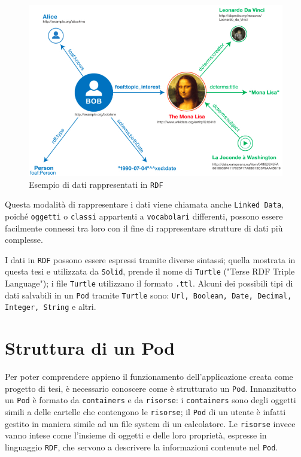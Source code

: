 \begin{figure}[ht]
	\centering
	\includegraphics[width=0.87
	\textwidth,  keepaspectratio]{fig/linkedData}
	\caption{Esempio di dati rappresentati in {\tt RDF}}
	\label{fig:linkedData}
\end{figure}

\medskip

Questa modalità di rappresentare i dati viene chiamata anche {\tt Linked Data}, poiché {\tt oggetti} o {\tt classi} appartenti a {\tt vocabolari} differenti, possono essere facilmente connessi tra loro con il fine di rappresentare strutture di dati più complesse.

\medskip

I dati in {\tt RDF} possono essere espressi tramite diverse sintassi; quella mostrata in questa tesi e utilizzata da {\tt Solid}, prende il nome di {\tt Turtle} ("Terse RDF Triple Language"); i file {\tt Turtle} utilizzano il formato {\tt .ttl}. Alcuni dei possibili tipi di dati salvabili in un {\tt Pod} tramite {\tt Turtle} sono: {\tt Url, Boolean, Date, Decimal, Integer, String} e altri.

\bigskip

\section{Struttura di un Pod}

\medskip 

Per poter comprendere appieno il funzionamento dell'applicazione creata come progetto di tesi, è necessario conoscere come è strutturato un {\tt Pod}. Innanzitutto un {\tt Pod} è formato da {\tt containers} e da {\tt risorse}: i {\tt containers} sono degli oggetti simili a delle cartelle che contengono le {\tt risorse};
il {\tt Pod} di un utente è infatti gestito in maniera simile ad un file system di un calcolatore. Le {\tt risorse} invece vanno intese come l'insieme di oggetti e delle loro proprietà, espresse in linguaggio {\tt RDF}, che servono a descrivere la informazioni contenute nel {\tt Pod}.

